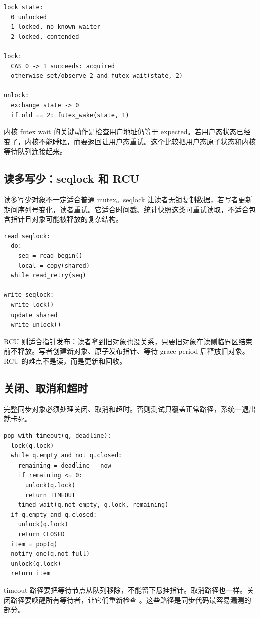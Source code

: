 \begin{lstlisting}
lock state:
  0 unlocked
  1 locked, no known waiter
  2 locked, contended

lock:
  CAS 0 -> 1 succeeds: acquired
  otherwise set/observe 2 and futex_wait(state, 2)

unlock:
  exchange state -> 0
  if old == 2: futex_wake(state, 1)
\end{lstlisting}

内核 futex wait 的关键动作是检查用户地址仍等于 expected。若用户态状态已经变了，内核不能睡眠，而要返回让用户态重试。这个比较把用户态原子状态和内核等待队列连接起来。

\subsection{读多写少：seqlock 和 RCU}

读多写少对象不一定适合普通 mutex。seqlock 让读者无锁复制数据，若写者更新期间序列号变化，读者重试。它适合时间戳、统计快照这类可重试读取，不适合包含指针且对象可能被释放的复杂结构。

\begin{lstlisting}
read seqlock:
  do:
    seq = read_begin()
    local = copy(shared)
  while read_retry(seq)

write seqlock:
  write_lock()
  update shared
  write_unlock()
\end{lstlisting}

RCU 则适合指针发布：读者拿到旧对象也没关系，只要旧对象在读侧临界区结束前不释放。写者创建新对象、原子发布指针、等待 grace period 后释放旧对象。RCU 的难点不是读，而是更新和回收。

\subsection{关闭、取消和超时}

完整同步对象必须处理关闭、取消和超时。否则测试只覆盖正常路径，系统一退出就卡死。

\begin{lstlisting}
pop_with_timeout(q, deadline):
  lock(q.lock)
  while q.empty and not q.closed:
    remaining = deadline - now
    if remaining <= 0:
      unlock(q.lock)
      return TIMEOUT
    timed_wait(q.not_empty, q.lock, remaining)
  if q.empty and q.closed:
    unlock(q.lock)
    return CLOSED
  item = pop(q)
  notify_one(q.not_full)
  unlock(q.lock)
  return item
\end{lstlisting}

timeout 路径要把等待节点从队列移除，不能留下悬挂指针。取消路径也一样。关闭路径要唤醒所有等待者，让它们重新检查 。这些路径是同步代码最容易漏测的部分。

